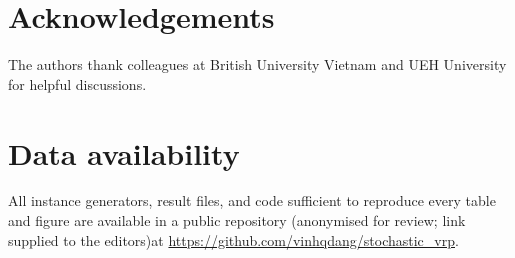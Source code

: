 \documentclass[preprint,authoryear,12pt]{elsarticle}
\theoremstyle{definition}
\theoremstyle{remark}
\begin{document}
\ifanon\else
\section*{Acknowledgements}
The authors thank colleagues at British University Vietnam and UEH
University for helpful
discussions.
\fi

\section*{Data availability}
All instance generators, result files, and code sufficient to reproduce
every table and figure are available in a public repository
\ifanon (anonymised for review; link supplied to the editors)\else at
\url{https://github.com/vinhqdang/stochastic_vrp}\fi.



\end{document}
